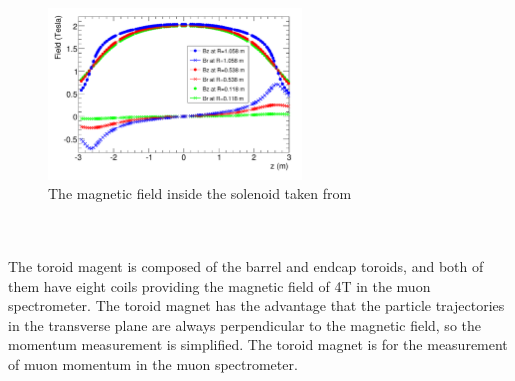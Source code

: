 \begin{figure}[!h]                
	\includegraphics[width=0.6\textwidth]{Chapter2/bfield}
	\centering
	\begin{center}
		\caption{The magnetic field inside the solenoid taken from \cite{Aleksa_2008}}
		\label{Fig:bfield}            
	\end{center}
\end{figure}
\\
\\The toroid magent is composed of the barrel and endcap toroids, and both of them have eight coils providing the magnetic field of 4T in the muon spectrometer. The toroid magnet has the advantage that the particle trajectories in the transverse plane are always perpendicular to the magnetic field, so the momentum measurement is simplified. The toroid magnet is for the measurement of muon momentum in the muon spectrometer. 

